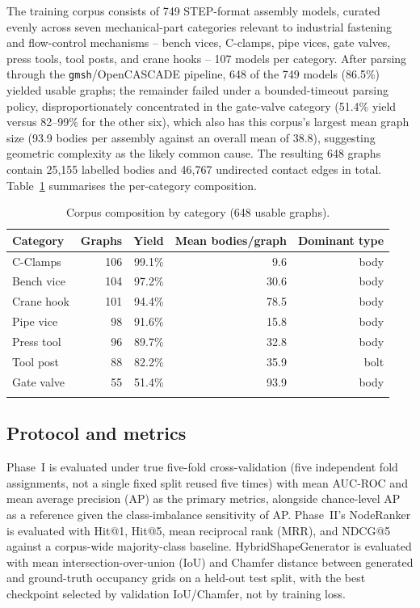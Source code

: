 \documentclass[sn-mathphys,Numbered]{sn-jnl}
\begin{document}
The training corpus consists of 749 STEP-format assembly models, curated evenly across seven mechanical-part categories relevant to industrial fastening and flow-control mechanisms -- bench vices, C-clamps, pipe vices, gate valves, press tools, tool posts, and crane hooks -- 107 models per category. After parsing through the \texttt{gmsh}/OpenCASCADE pipeline, 648 of the 749 models (86.5\%) yielded usable graphs; the remainder failed under a bounded-timeout parsing policy, disproportionately concentrated in the gate-valve category (51.4\% yield versus 82--99\% for the other six), which also has this corpus's largest mean graph size (93.9 bodies per assembly against an overall mean of 38.8), suggesting geometric complexity as the likely common cause. The resulting 648 graphs contain 25{,}155 labelled bodies and 46{,}767 undirected contact edges in total. Table~\ref{tab:corpus} summarises the per-category composition.


\begin{table}[h]
\caption{Corpus composition by category (648 usable graphs).}\label{tab:corpus}
\begin{tabular}{@{}lrrrr@{}}
\toprule
Category & Graphs & Yield & Mean bodies/graph & Dominant type \\
\midrule
C-Clamps    & 106 & 99.1\% & 9.6  & body \\
Bench vice  & 104 & 97.2\% & 30.6 & body \\
Crane hook  & 101 & 94.4\% & 78.5 & body \\
Pipe vice   & 98  & 91.6\% & 15.8 & body \\
Press tool  & 96  & 89.7\% & 32.8 & body \\
Tool post   & 88  & 82.2\% & 35.9 & bolt \\
Gate valve  & 55  & 51.4\% & 93.9 & body \\
\botrule
\end{tabular}
\end{table}

\subsection{Protocol and metrics}\label{sec:protocol}

Phase~I is evaluated under true five-fold cross-validation (five independent fold assignments, not a single fixed split reused five times) with mean AUC-ROC and mean average precision (AP) as the primary metrics, alongside chance-level AP as a reference given the class-imbalance sensitivity of AP. Phase~II's NodeRanker is evaluated with Hit@1, Hit@5, mean reciprocal rank (MRR), and NDCG@5 against a corpus-wide majority-class baseline. HybridShapeGenerator is evaluated with mean intersection-over-union (IoU) and Chamfer distance between generated and ground-truth occupancy grids on a held-out test split, with the best checkpoint selected by validation IoU/Chamfer, not by training loss.
\end{document}
